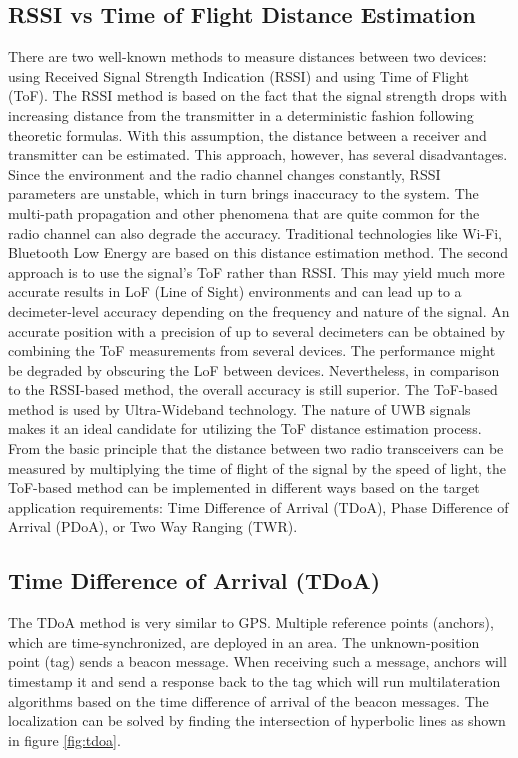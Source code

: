 \documentclass[\main/thesis.tex]{subfiles}
\begin{document}
\subsection{RSSI vs Time of Flight Distance Estimation}
There are two well-known methods to measure distances between two devices: using Received Signal Strength Indication (RSSI) and using Time of Flight (ToF).
\newline\newline
The RSSI method is based on the fact that the signal strength drops with increasing distance from the transmitter in a deterministic fashion following theoretic formulas. With this assumption, the distance between a receiver and transmitter can be estimated. This approach, however, has several disadvantages. Since the environment and the radio channel changes constantly, RSSI parameters are unstable, which in turn brings inaccuracy to the system. The multi-path propagation and other phenomena that are quite common for the radio channel can also degrade the accuracy. Traditional technologies like Wi-Fi, Bluetooth Low Energy are based on this distance estimation method.
\newline\newline
The second approach is to use the signal’s ToF rather than RSSI. This may yield much more accurate results in LoF (Line of Sight) environments and can lead up to a decimeter-level accuracy depending on the frequency and nature of the signal. An accurate position with a precision of up to several decimeters can be obtained by combining the ToF measurements from several devices. The performance might be degraded by obscuring the LoF between devices. Nevertheless, in comparison to the RSSI-based method, the overall accuracy is still superior. The ToF-based method is used by Ultra-Wideband technology. The nature of UWB signals makes it an ideal candidate for utilizing the ToF distance estimation process. 
\newline\newline
From the basic principle that the distance between two radio transceivers can be measured by multiplying the time of flight of the signal by the speed of light, 
the ToF-based method can be implemented in different ways based on the target application requirements: Time Difference of Arrival (TDoA), Phase Difference of Arrival (PDoA), or Two Way Ranging (TWR).

\subsection{Time Difference of Arrival (TDoA)}
The TDoA method is very similar to GPS. Multiple reference points (anchors), which are time-synchronized, are deployed in an area. The unknown-position point (tag) sends a beacon message. When receiving such a message, anchors will timestamp it and send a response back to the tag which will run multilateration algorithms based on the time difference of arrival of the beacon messages. The localization can be solved by finding the intersection of hyperbolic lines as shown in figure \ref{fig:tdoa}.
\end{document}

